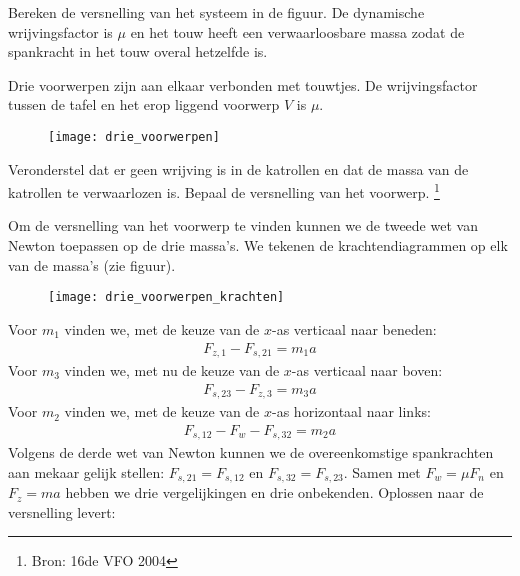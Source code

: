\begin{exercise} Bereken de versnelling van het systeem in de figuur. De dynamische wrijvingsfactor is $\mu$ en het touw heeft een verwaarloosbare massa zodat de spankracht in het touw overal hetzelfde is. 


\end{exercise}

\begin{exercise} Drie voorwerpen zijn aan elkaar verbonden met touwtjes. De wrij\-vings\-factor tussen de tafel en het erop liggend voorwerp $V$ is $\mu$.
\begin{figure}[h]
\begin{center}
\texttt{[image: drie\_voorwerpen]}
\end{center}
\end{figure}
Veronderstel dat er geen wrijving is in de katrollen en dat de massa van de katrollen te verwaarlozen is. Bepaal de versnelling van het voorwerp. \footnote{Bron: 16de VFO 2004}
\begin{oplossing}
\newline
Om de versnelling van het voorwerp te vinden kunnen we de tweede wet van Newton toepassen op de drie massa's. We tekenen de krachtendiagrammen op elk van de massa's (zie figuur). 
\begin{figure}[h]
\begin{center}
\texttt{[image: drie\_voorwerpen\_krachten]}
\end{center}
\end{figure}
\newline
Voor $m_1$ vinden we, met de keuze van de $x$-as verticaal naar beneden:
\begin{eqnarray}
F_{z,1}-F_{s,21}=m_1a\label{m_1}
\end{eqnarray}
Voor $m_3$ vinden we, met nu de keuze van de $x$-as verticaal naar boven:
\begin{eqnarray}
F_{s,23}-F_{z,3}=m_3a\label{m_3}
\end{eqnarray}
Voor $m_2$ vinden we, met de keuze van de $x$-as horizontaal naar links:
\begin{eqnarray}
F_{s,12}-F_w-F_{s,32}=m_2a\label{m_2}
\end{eqnarray}
Volgens de derde wet van Newton kunnen we de overeenkomstige spankrachten aan mekaar gelijk stellen: $F_{s,21}=F_{s,12}$ en $F_{s,32}=F_{s,23}$. Samen met $F_w=\mu F_n$ en $F_z=ma$ hebben we drie vergelijkingen en drie onbekenden. Oplossen naar de versnelling levert:

\end{oplossing}
\end{exercise}
